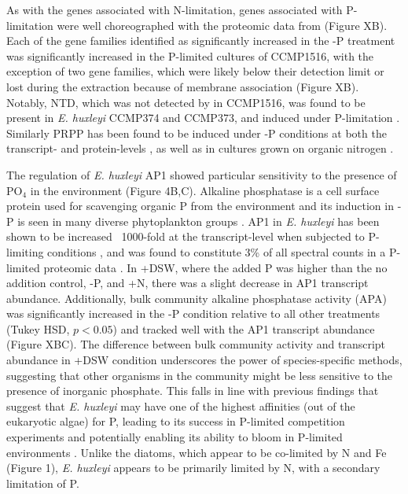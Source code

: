 As with the genes associated with N-limitation, genes associated with P-limitation were well choreographed with the proteomic data from \citet{McKew2015} (Figure XB). Each of the gene families identified as significantly increased in the -P treatment was significantly increased in the P-limited cultures of CCMP1516, with the exception of two gene families, which were likely below their detection limit or lost during the extraction because of membrane association (Figure XB). Notably, NTD, which was not detected by \citet{McKew2015} in CCMP1516, was found to be present in \textit{E. huxleyi} CCMP374 and CCMP373, and induced under P-limitation \citep{Dyhrman2003}. Similarly PRPP has been found to be induced under -P conditions at both the transcript- \citep{Dyhrman2006} and protein-levels \citep{McKew2015}, as well as in cultures grown on organic nitrogen \citep{Bruhn2010}. \par

The regulation of \textit{E. huxleyi} AP1 showed particular sensitivity to the presence of PO$_4$ in the environment (Figure 4B,C). Alkaline phosphatase is a cell surface protein used for scavenging organic P from the environment and its induction in -P is seen in many diverse phytoplankton groups \citep{Sakshaug1984, Dyhrman1997, Dyhrman2003, Wurch2011}. AP1 in \textit{E. huxleyi} has been shown to be increased ~1000-fold at the transcript-level when subjected to P-limiting conditions \citep{Xu2006}, and was found to constitute 3\% of all spectral counts in a P-limited proteomic data \citep{McKew2015}. In +DSW, where the added P was higher than the no addition control, -P, and +N, there was a slight decrease in AP1 transcript abundance. Additionally, bulk community alkaline phosphatase activity (APA) was significantly increased in the -P condition relative to all other treatments (Tukey HSD, $p < 0.05$) and tracked well with the AP1 transcript abundance (Figure XBC). The difference between bulk community activity and transcript abundance in +DSW condition underscores the power of species-specific methods, suggesting that other organisms in the community might be less sensitive to the presence of inorganic phosphate. This falls in line with previous findings that suggest that \textit{E. huxleyi} may have one of the highest affinities (out of the eukaryotic algae) for P, leading to its success in P-limited competition experiments \citep{Riegman2000} and potentially enabling its ability to bloom in P-limited environments \citep{Lessard2005}. Unlike the diatoms, which appear to be co-limited by N and Fe (Figure 1), \textit{E. huxleyi} appears to be primarily limited by N, with a secondary limitation of P. \par


